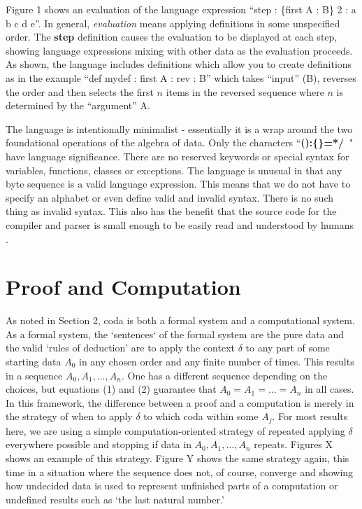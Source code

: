 \documentclass[11pt]{article}
\begin{document}
Figure 1 shows an evaluation of the language expression ``step : \{first A : B\} 2 : a b c d e''.  In general, {\it evaluation} means applying 
definitions in some unspecified order.  The {\bf step} definition causes the evaluation to be displayed at each step, showing language expressions 
mixing with other data as the evaluation proceeds.  As shown, the language includes definitions which allow you to create definitions as in the 
example ``def mydef : {first A : rev : B}'' which takes ``input'' (B), reverses the order and then selects the first $n$ items in the reversed sequence 
where $n$ is determined by the ``argument'' A.  

     The language is intentionally minimalist - essentially it is a wrap around the two foundational operations of the algebra of data.
Only the characters ``{\bf():\{\}=*/\ }" have language significance.  There are no reserved keywords or 
special syntax for variables, functions, classes or exceptions.  The language is unusual in that any byte sequence is a valid language expression.  
This means that we do not have to specify an alphabet or even define valid and invalid syntax.  There is no such thing 
as invalid syntax.  This also has the benefit that the source code for the compiler and parser is small enough to be easily read and understood by 
humans \cite{github}.

\section{Proof and Computation}

     As noted in Section 2, coda is both a formal system and a computational system.  As a formal system, the `sentences` of the formal system 
are the pure data and the valid `rules of deduction' are to apply the context $\delta$ to any part of some starting data $A_0$ in any chosen order and any finite 
number of times.   This results in a sequence $A_0,A_1,\dots,A_n$.  One has a different sequence depending on the choices, but equations (1) and (2) 
guarantee that $A_0=A_1=\dots=A_n$ in all cases.  In this framework, the difference between a proof 
and a computation is merely in the strategy of when to apply $\delta$ to which coda within some $A_j$.  For most results here, we are using 
a simple computation-oriented strategy of repeated applying $\delta$ everywhere possible and stopping if data in $A_0,A_1,\dots,A_n$ repeats. 
Figures X shows an example of this strategy.   Figure Y shows the same strategy again, this time in a situation 
where the sequence does not, of course, converge and showing how undecided data is used to represent unfinished parts of a
computation or undefined results such as `the last natural number.' 
\end{document}
